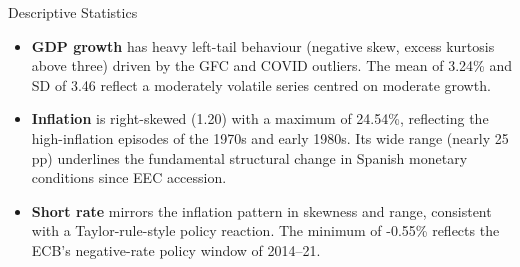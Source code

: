 \documentclass[9pt]{beamer}
\begin{document}
\begin{frame}{Descriptive Statistics}

{\footnotesize
\setlength{\tabcolsep}{4pt}

}

{\footnotesize
\begin{itemize}
    \item \textbf{GDP growth} has heavy left-tail behaviour (negative skew, excess kurtosis above three) driven by the GFC and COVID outliers. The mean of 3.24\% and SD of 3.46 reflect a moderately volatile series centred on moderate growth.

    \item \textbf{Inflation} is right-skewed (1.20) with a maximum of 24.54\%, reflecting the high-inflation episodes of the 1970s and early 1980s. Its wide range (nearly 25 pp) underlines the fundamental structural change in Spanish monetary conditions since EEC accession.

    \item \textbf{Short rate} mirrors the inflation pattern in skewness and range, consistent with a Taylor-rule-style policy reaction. The minimum of -0.55\% reflects the ECB's negative-rate policy window of 2014--21.
\end{itemize}
}

\end{frame}
\end{document}
